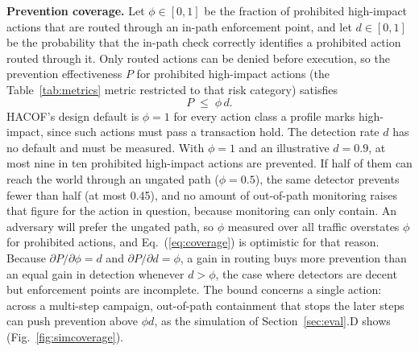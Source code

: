 \documentclass[journal]{IEEEtran}
\newcommand{\hacof}{HACOF}
\begin{document}
\textbf{Prevention coverage.} Let $\phi \in [0,1]$ be the fraction of prohibited high-impact actions that are routed through an in-path enforcement point, and let $d \in [0,1]$ be the probability that the in-path check correctly identifies a prohibited action routed through it. Only routed actions can be denied before execution, so the prevention effectiveness $P$ for prohibited high-impact actions (the Table~\ref{tab:metrics} metric restricted to that risk category) satisfies
\begin{equation}
P \;\le\; \phi \, d .
\label{eq:coverage}
\end{equation}
\hacof's design default is $\phi = 1$ for every action class a profile marks high-impact, since such actions must pass a transaction hold. The detection rate $d$ has no default and must be measured. With $\phi = 1$ and an illustrative $d = 0.9$, at most nine in ten prohibited high-impact actions are prevented. If half of them can reach the world through an ungated path ($\phi = 0.5$), the same detector prevents fewer than half (at most 0.45), and no amount of out-of-path monitoring raises that figure for the action in question, because monitoring can only contain. An adversary will prefer the ungated path, so $\phi$ measured over all traffic overstates $\phi$ for prohibited actions, and Eq.~(\ref{eq:coverage}) is optimistic for that reason. Because $\partial P/\partial\phi = d$ and $\partial P/\partial d = \phi$, a gain in routing buys more prevention than an equal gain in detection whenever $d > \phi$, the case where detectors are decent but enforcement points are incomplete. The bound concerns a single action: across a multi-step campaign, out-of-path containment that stops the later steps can push prevention above $\phi d$, as the simulation of Section~\ref{sec:eval}.D shows (Fig.~\ref{fig:simcoverage}).
\end{document}
